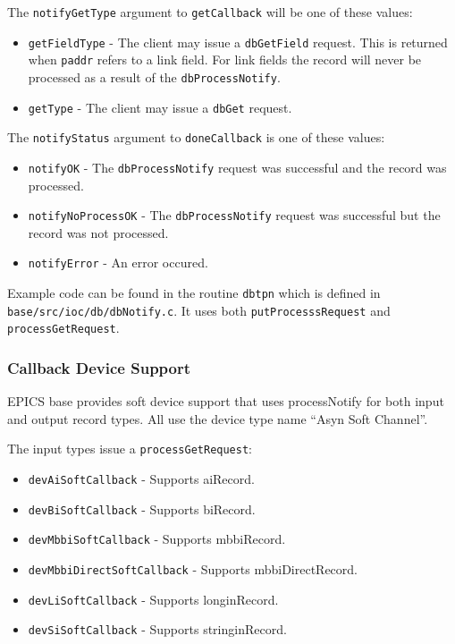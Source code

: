 The \verb|notifyGetType| argument to \verb|getCallback| will be one of these values:

\begin{itemize}

\item \verb|getFieldType| - The client may issue a \verb|dbGetField| request.
This is returned when \verb|paddr| refers to a link field.
For link fields the record will never be processed as a result of the \verb|dbProcessNotify|.

\item \verb|getType| - The client may issue a \verb|dbGet| request.

\end{itemize}

The \verb|notifyStatus| argument to \verb|doneCallback|  is one of these values:

\begin{itemize}

\item \verb|notifyOK| - The \verb|dbProcessNotify| request was successful and the record was processed.

\item \verb|notifyNoProcessOK| - The \verb|dbProcessNotify| request was successful but the record was not processed.

\item \verb|notifyError| - An error occured.

\end{itemize}

Example code can be found in the routine \verb|dbtpn| which is defined in \verb|base/src/ioc/db/dbNotify.c|. It uses both \verb|putProcesssRequest| and \verb|processGetRequest|.

\subsubsection{Callback Device Support}

EPICS base provides soft device support that uses processNotify for both input and output record types. All use the device type name ``Asyn Soft Channel''.

The input types issue a \verb|processGetRequest|:

\begin{itemize}

\item \verb|devAiSoftCallback| - Supports aiRecord.

\item \verb|devBiSoftCallback| - Supports biRecord.

\item \verb|devMbbiSoftCallback| - Supports mbbiRecord.

\item \verb|devMbbiDirectSoftCallback| - Supports mbbiDirectRecord.

\item \verb|devLiSoftCallback| - Supports longinRecord.

\item \verb|devSiSoftCallback| - Supports stringinRecord.

\end{itemize}

